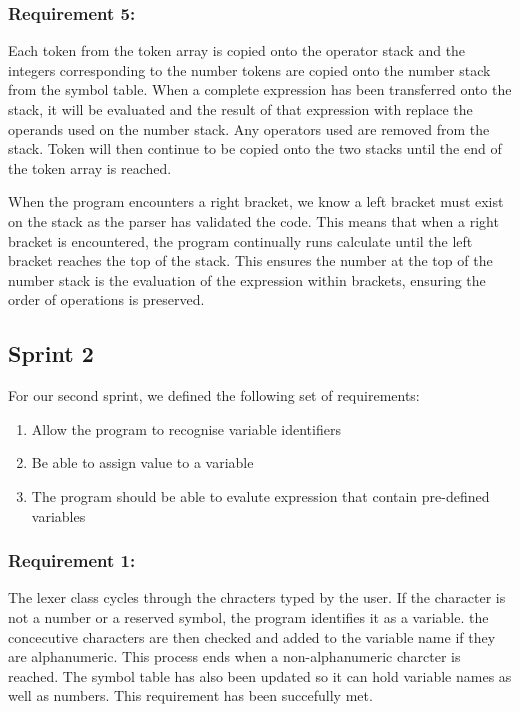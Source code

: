 \documentclass[a4paper, oneside, 11pt]{report}
\begin{document}
\subsubsection{Requirement 5: }

Each token from the token array is copied onto the operator stack and the integers corresponding to the number tokens are copied onto the number stack from the symbol table. When a complete expression has been transferred onto the stack, it will be evaluated and the result of that expression with replace the operands used on the number stack. Any operators used are removed from the stack. Token will then continue to be copied onto the two stacks until the end of the token array is reached.  

When the program encounters a right bracket, we know a left bracket must exist on the stack as the parser has validated the code. This means that when a right bracket is encountered, the program continually runs calculate until the left bracket reaches the top of the stack. This ensures the number at the top of the number stack is the evaluation of the expression within brackets, ensuring the order of operations is preserved. 

\subsection{Sprint 2}

For our second sprint, we defined the following set of requirements: 

\begin{enumerate}
\item Allow the program to recognise variable identifiers
\item Be able to assign value to a variable
\item The program should be able to evalute expression that contain pre-defined variables
\end{enumerate}

\subsubsection{Requirement 1: }

The lexer class cycles through the chracters typed by the user. If the character is not a number or a reserved symbol, the program identifies it as a variable. the concecutive characters are then checked and added to the variable name if they are alphanumeric. This process ends when a non-alphanumeric charcter is reached.
The symbol table has also been updated so it can hold variable names as well as numbers.
This requirement has been succefully met.
\end{document}

